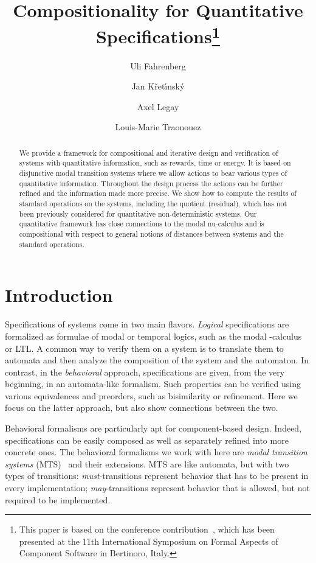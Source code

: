 \documentclass[twocolumn]{svjour3-dummy}
\title{Compositionality for Quantitative Specifications\thanks{This paper is based on the conference
    contribution~\cite{DBLP:conf/facs2/FahrenbergKLT14}, which has been
    presented at the 11th International Symposium on Formal Aspects of
    Component Software in Bertinoro, Italy.}}
\author{Uli Fahrenberg \and Jan K{\v r}et{\'\i}nsk{\'y} \and
  Axel Legay \and Louis-Marie Traonouez}
\institute{Uli Fahrenberg \and Axel Legay \and Louis-Marie Traonouez
  \at Irisa / Inria Rennes \and Jan K{\v r}et{\'\i}nsk{\'y} \at
  Technical University of Munich}
\begin{document}
\maketitle

\begin{abstract}
  We provide a framework for compositional and iterative design and
  verification of systems with quantitative information, such as
  rewards, time or energy. It is based on disjunctive modal transition
  systems where we allow actions to bear various types of quantitative
  information. Throughout the design process the actions can be further
  refined and the information made more precise. We show how to compute
  the results of standard operations on the systems, including the
  quotient (residual), which has not been previously considered for
  quantitative non-deterministic systems. Our quantitative framework has
  close connections to the modal nu-calculus and is compositional with
  respect to general notions of distances between systems and the
  standard operations.
\end{abstract}

\section{Introduction}
\label{sec:intro}

Specifications of systems come in two main flavors. \emph{Logical}
specifications are formalized as formulae of modal or temporal logics,
such as the modal -calculus or LTL. A common way to verify them on
a system is to translate them to automata and then analyze the
composition of the system and the automaton. In contrast, in the
\emph{behavioral} approach, specifications are given, from the very
beginning, in an automata-like formalism. Such properties can be
verified using various equivalences and preorders, such as bisimilarity
or refinement.  Here we focus on the latter approach, but also show
connections between the two.

Behavioral formalisms are particularly apt for com\-ponent-based design.
Indeed, specifications can be easily composed as well as separately
refined into more concrete ones.  The behavioral formalisms we work with
here are \emph{modal transition systems}
(MTS)~\cite{DBLP:conf/lics/LarsenT88} and their extensions. MTS are like
automata, but with two types of transitions: \emph{must}-transitions
represent behavior that has to be present in every implementation;
\emph{may}-tran\-sitions represent behavior that is allowed, but not
required to be implemented.
\end{document}
